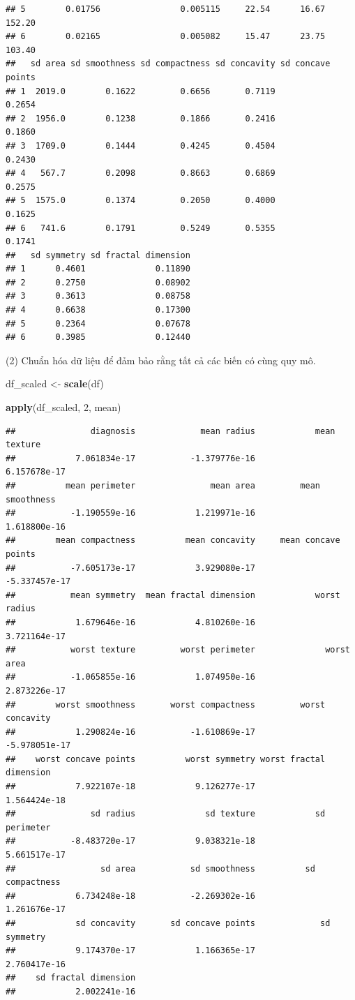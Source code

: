 \documentclass[
]{article}
\newenvironment{Shaded}{\begin{snugshade}}{\end{snugshade}}
\newcommand{\DecValTok}[1]{\textcolor[rgb]{0.00,0.00,0.81}{#1}}
\newcommand{\FunctionTok}[1]{\textcolor[rgb]{0.13,0.29,0.53}{\textbf{#1}}}
\newcommand{\NormalTok}[1]{#1}
\newcommand{\OtherTok}[1]{\textcolor[rgb]{0.56,0.35,0.01}{#1}}
\begin{document}
\begin{verbatim}
## 5        0.01756                0.005115     22.54      16.67       152.20
## 6        0.02165                0.005082     15.47      23.75       103.40
##   sd area sd smoothness sd compactness sd concavity sd concave points
## 1  2019.0        0.1622         0.6656       0.7119            0.2654
## 2  1956.0        0.1238         0.1866       0.2416            0.1860
## 3  1709.0        0.1444         0.4245       0.4504            0.2430
## 4   567.7        0.2098         0.8663       0.6869            0.2575
## 5  1575.0        0.1374         0.2050       0.4000            0.1625
## 6   741.6        0.1791         0.5249       0.5355            0.1741
##   sd symmetry sd fractal dimension
## 1      0.4601              0.11890
## 2      0.2750              0.08902
## 3      0.3613              0.08758
## 4      0.6638              0.17300
## 5      0.2364              0.07678
## 6      0.3985              0.12440
\end{verbatim}

\hfill\break
(2) Chuẩn hóa dữ liệu để đảm bảo rằng tất cả các biến có cùng quy mô.

\begin{Shaded}
\begin{Highlighting}[]
\NormalTok{df\_scaled }\OtherTok{\textless{}{-}} \FunctionTok{scale}\NormalTok{(df)}

\FunctionTok{apply}\NormalTok{(df\_scaled, }\DecValTok{2}\NormalTok{, mean)}
\end{Highlighting}
\end{Shaded}

\begin{verbatim}
##               diagnosis             mean radius            mean texture 
##            7.061834e-17           -1.379776e-16            6.157678e-17 
##          mean perimeter               mean area         mean smoothness 
##           -1.190559e-16            1.219971e-16            1.618800e-16 
##        mean compactness          mean concavity     mean concave points 
##           -7.605173e-17            3.929080e-17           -5.337457e-17 
##           mean symmetry  mean fractal dimension            worst radius 
##            1.679646e-16            4.810260e-16            3.721164e-17 
##           worst texture         worst perimeter              worst area 
##           -1.065855e-16            1.074950e-16            2.873226e-17 
##        worst smoothness       worst compactness         worst concavity 
##            1.290824e-16           -1.610869e-17           -5.978051e-17 
##    worst concave points          worst symmetry worst fractal dimension 
##            7.922107e-18            9.126277e-17            1.564424e-18 
##               sd radius              sd texture            sd perimeter 
##           -8.483720e-17            9.038321e-18            5.661517e-17 
##                 sd area           sd smoothness          sd compactness 
##            6.734248e-18           -2.269302e-16            1.261676e-17 
##            sd concavity       sd concave points             sd symmetry 
##            9.174370e-17            1.166365e-17            2.760417e-16 
##    sd fractal dimension 
##            2.002241e-16
\end{verbatim}
\end{document}
